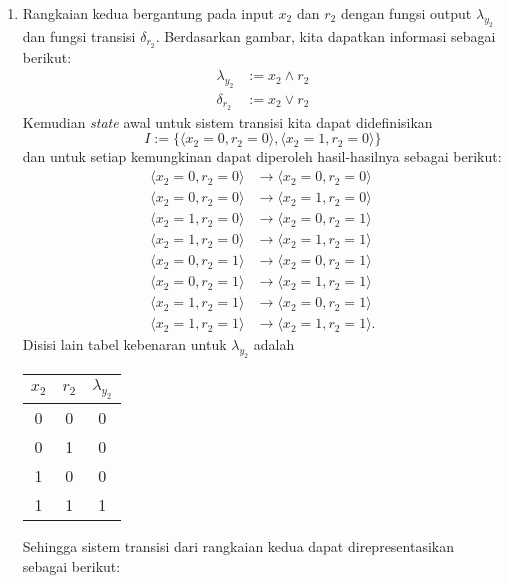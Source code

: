 \documentclass[a4paper]{article}
\theoremstyle{definition}
\begin{document}
\begin{enumerate}[label=(\arabic*)]
  \item Rangkaian kedua bergantung pada input $x_2$ dan $r_2$ dengan fungsi output $\lambda_{y_2}$ dan fungsi transisi $\delta_{r_2}$. Berdasarkan gambar, kita dapatkan informasi sebagai berikut:
  \begin{align*}
    \lambda_{y_2} &:= x_2 \land r_2 \\
    \delta_{r_2} &:= x_2 \lor r_2
  \end{align*}
  Kemudian \textit{state} awal untuk sistem transisi kita dapat didefinisikan 
  \[I:=\{\langle x_2=0, r_2=0 \rangle, \langle x_2=1, r_2=0 \rangle\}\]
  dan untuk setiap kemungkinan dapat diperoleh hasil-hasilnya sebagai berikut:
  \begin{align*}
    \langle x_2=0, r_2=0 \rangle &\longrightarrow \langle x_2=0, r_2=0 \rangle\\
    \langle x_2=0, r_2=0 \rangle &\longrightarrow \langle x_2=1, r_2=0 \rangle\\
    \langle x_2=1, r_2=0 \rangle &\longrightarrow \langle x_2=0, r_2=1 \rangle\\
    \langle x_2=1, r_2=0 \rangle &\longrightarrow \langle x_2=1, r_2=1 \rangle\\
    \langle x_2=0, r_2=1 \rangle &\longrightarrow \langle x_2=0, r_2=1 \rangle\\
    \langle x_2=0, r_2=1 \rangle &\longrightarrow \langle x_2=1, r_2=1 \rangle\\
    \langle x_2=1, r_2=1 \rangle &\longrightarrow \langle x_2=0, r_2=1 \rangle\\
    \langle x_2=1, r_2=1 \rangle &\longrightarrow \langle x_2=1, r_2=1 \rangle.
  \end{align*}
  Disisi lain tabel kebenaran untuk $\lambda_{y_2}$ adalah
  \begin{center}
    \begin{tabular}{|c|c|c|}
      \hline
      $x_2$ & $r_2$ & $\lambda_{y_2}$\\
      \hline
      0 & 0 & 0\\
      0 & 1 & 0\\
      1 & 0 & 0\\
      1 & 1 & 1\\
      \hline
    \end{tabular}
  \end{center}
  Sehingga sistem transisi dari rangkaian kedua dapat direpresentasikan sebagai berikut:
  \begin{center}
    \begin{tikzpicture}[
      ->, >=stealth, node distance=2.5cm, on grid, thick,initial text=,
      state/.style={rectangle, rounded corners, draw, minimum width=2.0cm, minimum height=1cm},
      every loop/.style={looseness=3}]
  

\end{tikzpicture}
\end{center}
\end{enumerate}
\end{document}
